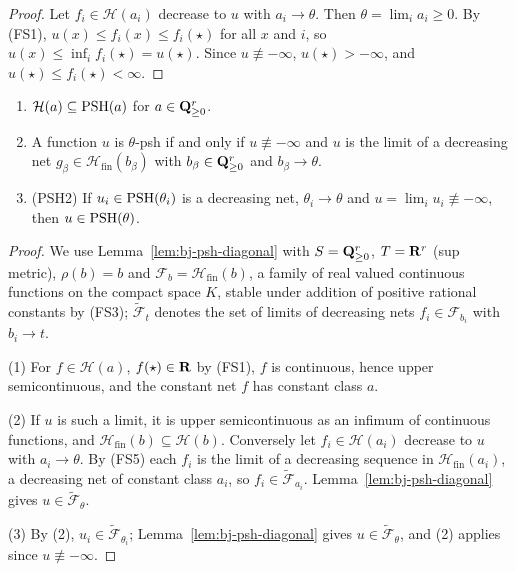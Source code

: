 \begin{proof}
Let $f_i\in\mathcal H(a_i)$ decrease to $u$ with $a_i\to\theta$. Then $\theta=\lim_ia_i\ge0$. By (FS1),
$u(x)\le f_i(x)\le f_i(\star)$ for all $x$ and $i$, so $u(x)\le\inf_if_i(\star)=u(\star)$. Since $u\not\equiv-\infty$,
$u(\star)>-\infty$, and $u(\star)\le f_i(\star)<\infty$.
\end{proof}

\begin{theorem}\label{thm:pg-psh2}
\leanok
{}
\begin{enumerate}
\item $\mathcal H(a)\subseteq\operatorname{PSH}(a)$ for $a\in\mathbf{Q}^r_{\ge0}$.
\item A function $u$ is $\theta$-psh if and only if $u\not\equiv-\infty$ and $u$ is the limit of a decreasing net
$g_\beta\in\mathcal H_{\mathrm{fin}}(b_\beta)$ with $b_\beta\in\mathbf{Q}^r_{\ge0}$ and $b_\beta\to\theta$.
\item (PSH2) If $u_i\in\operatorname{PSH}(\theta_i)$ is a decreasing net, $\theta_i\to\theta$ and $u=\lim_iu_i\not\equiv-\infty$, then
$u\in\operatorname{PSH}(\theta)$.
\end{enumerate}
\end{theorem}

\begin{proof}
We use Lemma~\ref{lem:bj-psh-diagonal} with $S=\mathbf{Q}^r_{\ge0}$, $T=\mathbf{R}^r$ (sup metric), $\rho(b)=b$ and
$\mathcal F_b=\mathcal H_{\mathrm{fin}}(b)$, a family of real valued continuous functions on the compact space $K$, stable under
addition of positive rational constants by (FS3); $\widetilde{\mathcal F}_t$ denotes the set of limits of decreasing nets
$f_i\in\mathcal F_{b_i}$ with $b_i\to t$.

(1) For $f\in\mathcal H(a)$, $f(\star)\in\mathbf{R}$ by (FS1), $f$ is continuous, hence upper semicontinuous, and the constant net
$f$ has constant class $a$.

(2) If $u$ is such a limit, it is upper semicontinuous as an infimum of continuous functions, and
$\mathcal H_{\mathrm{fin}}(b)\subseteq\mathcal H(b)$. Conversely let $f_i\in\mathcal H(a_i)$ decrease to $u$ with $a_i\to\theta$. By (FS5) each
$f_i$ is the limit of a decreasing sequence in $\mathcal H_{\mathrm{fin}}(a_i)$, a decreasing net of constant class $a_i$,
so $f_i\in\widetilde{\mathcal F}_{a_i}$. Lemma~\ref{lem:bj-psh-diagonal} gives $u\in\widetilde{\mathcal F}_\theta$.

(3) By (2), $u_i\in\widetilde{\mathcal F}_{\theta_i}$; Lemma~\ref{lem:bj-psh-diagonal} gives $u\in\widetilde{\mathcal F}_\theta$, and (2)
applies since $u\not\equiv-\infty$.
\end{proof}

